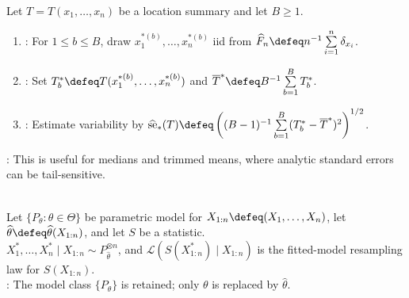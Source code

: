 \begin{method} \label{meth:bootstrap-location-standard-errors} \\
Let $T=T(x_1,\ldots,x_n)$ be a location summary and let $B\geq1$.
\begin{enumerate}[label=(\roman*)]
\setlength{\itemsep}{0pt}
\item {}: For $1\leq b\leq B$, draw $x_1^{*(b)},\ldots,x_n^{*(b)}$ iid from $\widehat F_n\defeq n^{-1}\sum\limits_{i=1}^n\delta_{x_i}$.
\item {}: Set $T_b^\ast\defeq T(x_1^{*(b)},\ldots,x_n^{*(b)})$ and $\overline{T}^{\ast}\defeq B^{-1}\sum\limits_{b=1}^BT_b^\ast$.
\item {}: Estimate variability by $\widehat{\operatorname{se}}_{\ast}(T)\defeq\left((B-1)^{-1}\sum\limits_{b=1}^B(T_b^\ast-\overline{T}^{\ast})^2\right)^{1/2}$.
\end{enumerate}
: This is useful for medians and trimmed means, where analytic standard errors can be tail-sensitive.
\end{method}

\begin{definition} \label{def:parametric-bootstrap} \\
Let $\{P_\theta:\theta\in\Theta\}$ be parametric model for $X_{1:n}\defeq(X_1,\ldots,X_n)$, let $\widehat{\theta}\defeq\widehat{\theta}(X_{1:n})$, and let $S$ be a statistic.\\
$X_1^\ast,\ldots,X_n^\ast\mid X_{1:n}\sim P_{\widehat{\theta}}^{\otimes n}$, and $\mathcal{L}(S(X_{1:n}^\ast)\mid X_{1:n})$ is the fitted-model resampling law for $S(X_{1:n})$.\\
: The model class $\{P_\theta\}$ is retained; only $\theta$ is replaced by $\widehat{\theta}$.
\end{definition}

